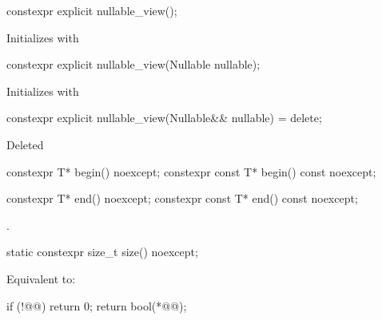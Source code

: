 %

\pnum
\begin{itemdecl}
  constexpr explicit nullable_view();
\end{itemdecl}
\begin{itemdescr}
  \pnum{}
  \effects{}
  Initializes  with 
\end{itemdescr}

\begin{itemdecl}
  constexpr explicit nullable_view(Nullable nullable);
\end{itemdecl}
\begin{itemdescr}
  \pnum{}
  \effects{}
  Initializes  with 
\end{itemdescr}


\begin{itemdecl}
constexpr explicit nullable_view(Nullable&& nullable) = delete;
\end{itemdecl}
\begin{itemdescr}
  \pnum{}
  Deleted
\end{itemdescr}

\begin{itemdecl}
  constexpr T* begin() noexcept;
  constexpr const T* begin() const noexcept;
\end{itemdecl}

\begin{itemdescr}
  \pnum
  \returns
\end{itemdescr}

\begin{itemdecl}
  constexpr T* end() noexcept;
  constexpr const T* end() const noexcept;
\end{itemdecl}

\begin{itemdescr}
  \pnum{}
  \returns
  .
\end{itemdescr}

\begin{itemdecl}
  static constexpr size_t size() noexcept;
\end{itemdecl}

\begin{itemdescr}
  \pnum{}
  \effects{}
  Equivalent to:

  \begin{codeblock}
    if (!@@)
      return 0;
    return bool(*@@);
  \end{codeblock}
\end{itemdescr}

